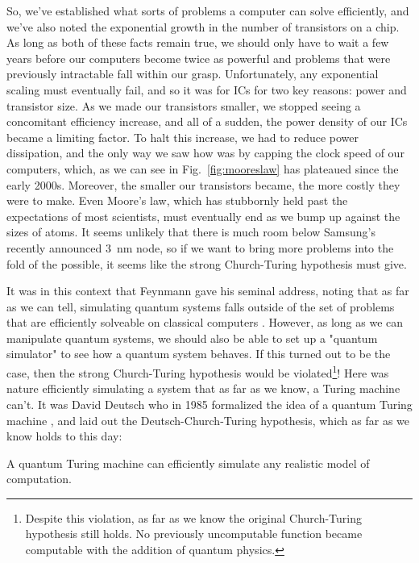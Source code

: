 So, we've established what sorts of problems a computer can solve efficiently, and we've also noted the
exponential growth in the number of transistors on a chip. As long as both of these facts remain true, we
should only have to wait a few years before our computers become twice as powerful and problems that were
previously intractable fall within our grasp. Unfortunately, any exponential scaling must eventually fail,
and so it was for ICs for two key reasons: power and transistor size. As we made our transistors smaller,
we stopped seeing a concomitant efficiency increase, and all of a sudden, the power density of our ICs
became a limiting factor. To halt this increase, we had to reduce power dissipation, and the
only way we saw how was by capping the clock speed of our computers, which, as we can see in Fig.~\ref{fig:mooreslaw}
has plateaued since the early 2000s. Moreover, the smaller our transistors became, the more costly they were
to make. Even Moore's law, which has stubbornly held past the expectations of most scientists, must eventually
end as we bump up against the sizes of atoms. It seems unlikely that there is much room below Samsung's
recently announced \SI{3}{\nano\meter} node, so if we want to bring more problems into the fold of the
possible, it seems like the strong Church-Turing hypothesis must give.

It was in this context that Feynmann gave his seminal address, noting that as far as we can tell, simulating
quantum systems falls outside of the set of problems that are efficiently solveable on classical computers \cite{Feynman1982}.
However, as long as we can manipulate quantum systems, we should also be able to set up a "quantum
simulator" to see how a quantum system behaves. If this turned out to be the case, then the strong
Church-Turing hypothesis would be violated\footnote{Despite this violation, as far as we know the original
Church-Turing hypothesis still holds. No previously uncomputable function became computable with the addition
of quantum physics.}! Here was nature efficiently simulating a system that as far as we know, a Turing machine
can't. It was David Deutsch who in 1985 formalized the idea of a quantum Turing machine \cite{doi:10.1098/rspa.1985.0070},
and laid out the Deutsch-Church-Turing hypothesis, which as far as we know holds to this day:

\begin{displayquote}
  A quantum Turing machine can efficiently simulate any realistic model of computation.
\end{displayquote}


